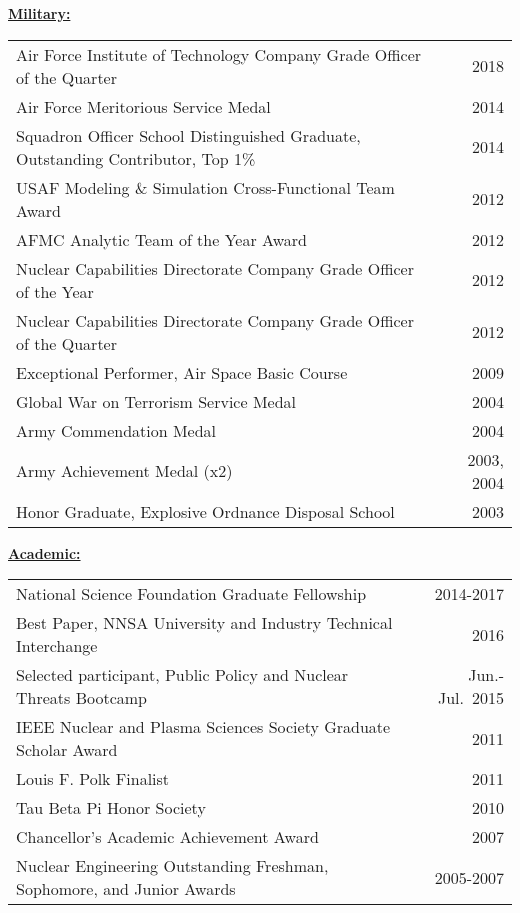 \underline{\textbf{Military:}}\\
\begin{tabular}{ @{} l @{\hspace{6ex}} r }
Air Force Institute of Technology Company Grade Officer of the Quarter & 2018 \\
Air Force Meritorious Service Medal & 2014 \\
Squadron Officer School Distinguished Graduate, Outstanding Contributor, Top 1\% & 2014 \\
USAF Modeling \& Simulation Cross-Functional Team Award & 2012 \\
AFMC Analytic Team of the Year Award & 2012 \\
Nuclear Capabilities Directorate Company Grade Officer of the Year & 2012 \\
Nuclear Capabilities Directorate Company Grade Officer of the Quarter & 2012 \\
Exceptional Performer, Air Space Basic Course & 2009 \\
Global War on Terrorism Service Medal & 2004 \\
Army Commendation Medal & 2004 \\
Army Achievement Medal (x2) & 2003, 2004 \\
Honor Graduate, Explosive Ordnance Disposal School & 2003 \\
\end{tabular}

\underline{\textbf{Academic:}}\\
\begin{tabular}{ @{} l @{\hspace{9.5ex}} r }
National Science Foundation Graduate Fellowship & 2014-2017 \\
Best Paper, NNSA University and Industry Technical Interchange & 2016 \\
Selected participant, Public Policy and Nuclear Threats Bootcamp	& Jun.-Jul.\ 2015 \\
IEEE Nuclear and Plasma Sciences Society Graduate Scholar Award & 2011 \\
Louis F. Polk Finalist & 2011 \\
Tau Beta Pi Honor Society	& 2010 \\
Chancellor’s Academic Achievement Award	& 2007 \\
Nuclear Engineering Outstanding Freshman, Sophomore, and Junior Awards & 2005-2007 \\
\end{tabular}
